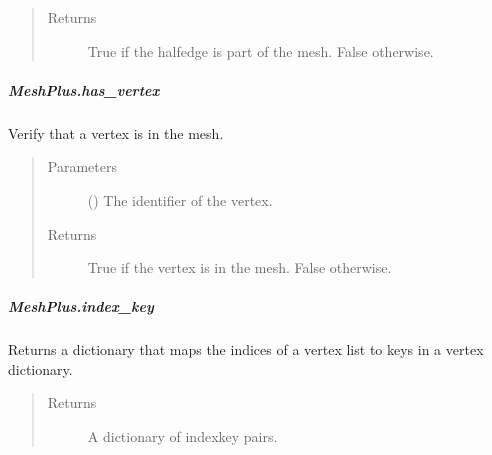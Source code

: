 \documentclass[letterpaper,10pt,english]{sphinxmanual}
\begin{document}
\begin{fulllineitems}
\begin{fulllineitems}
\begin{quote}
\begin{description}
\item[{Returns}] \leavevmode
{} \textendash{} True if the halfedge is part of the mesh.
False otherwise.

\end{description}\end{quote}

\end{fulllineitems}



\subparagraph{MeshPlus.has\_vertex}
\label{\detokenize{api/generated/directional_clustering.mesh.MeshPlus.has_vertex:meshplus-has-vertex}}\label{\detokenize{api/generated/directional_clustering.mesh.MeshPlus.has_vertex::doc}}

\begin{fulllineitems}
\label{\detokenize{api/generated/directional_clustering.mesh.MeshPlus.has_vertex:directional_clustering.mesh.MeshPlus.has_vertex}}
Verify that a vertex is in the mesh.
\begin{quote}\begin{description}
\item[{Parameters}] \leavevmode
{} () \textendash{} The identifier of the vertex.

\item[{Returns}] \leavevmode
{} \textendash{} True if the vertex is in the mesh.
False otherwise.

\end{description}\end{quote}

\end{fulllineitems}



\subparagraph{MeshPlus.index\_key}
\label{\detokenize{api/generated/directional_clustering.mesh.MeshPlus.index_key:meshplus-index-key}}\label{\detokenize{api/generated/directional_clustering.mesh.MeshPlus.index_key::doc}}

\begin{fulllineitems}
\label{\detokenize{api/generated/directional_clustering.mesh.MeshPlus.index_key:directional_clustering.mesh.MeshPlus.index_key}}
Returns a dictionary that maps the indices of a vertex list to
keys in a vertex dictionary.
\begin{quote}\begin{description}
\item[{Returns}] \leavevmode
{} \textendash{} A dictionary of index\sphinxhyphen{}key pairs.


\end{description}
\end{quote}
\end{fulllineitems}
\end{fulllineitems}
\end{document}
